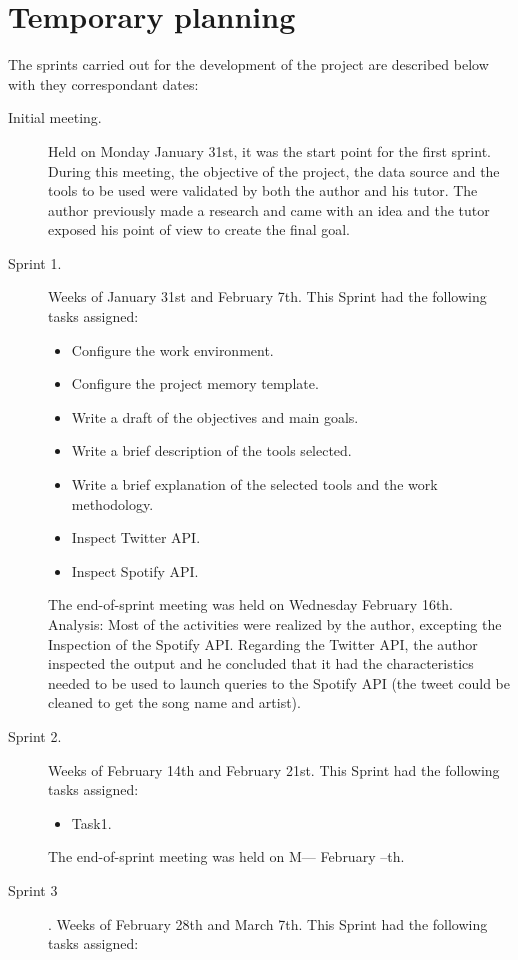 \section{Temporary planning}
\nonzeroparskip The sprints carried out for the development of the project are described below with they correspondant dates:
\begin{description}
	\item[Initial meeting.] Held on Monday January 31st, it was the start point for the first sprint. During this meeting, the objective of the project, the data source and the tools to be used were validated by both the author and his tutor. The author previously made a research and came with an idea and the tutor exposed his point of view to create the final goal.
	\item[Sprint 1.] Weeks of January 31st and February 7th. This Sprint had the following tasks assigned:
	\begin{itemize}
		\item Configure the work environment.
		\item Configure the project memory template.
		\item Write a draft of the objectives and main goals.
		\item Write a brief description of the tools selected.
		\item Write a brief explanation of the selected tools and the work methodology.
		\item Inspect Twitter API.
		\item Inspect Spotify API.
	\end{itemize}
	The end-of-sprint meeting was held on Wednesday February 16th.
	Analysis: Most of the activities were realized by the author, excepting the Inspection of the Spotify API. Regarding the Twitter API, the author inspected the output and he concluded that it had the characteristics needed to be used to launch queries to the Spotify API (the tweet could be cleaned to get the song name and artist).
	\item[Sprint 2.] Weeks of February 14th and February 21st. This Sprint had the following tasks assigned:
	\begin{itemize}
		\item Task1.
	\end{itemize}
	The end-of-sprint meeting was held on M--- February --th.
	\item[Sprint 3]. Weeks of February 28th and March 7th. This Sprint had the following tasks assigned:
	\begin{itemize}

\end{itemize}
\end{description}
